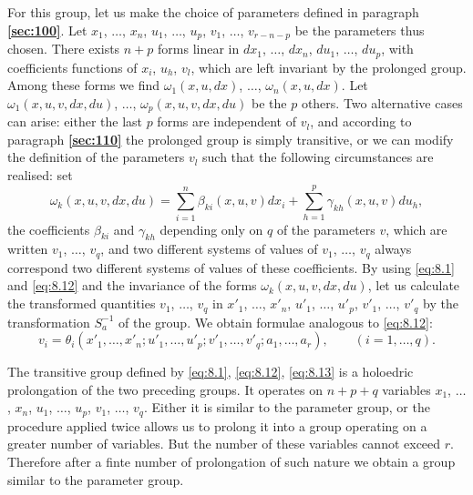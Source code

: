 \documentclass[leqno,11pt]{book}
\numberwithin{equation}{chapter}
\theoremstyle{shape1}
\theoremstyle{shapesmall}
\newcommand{\fsref}[1]{{\rm\textsection\textbf{\ref{sec:#1}}}}
\newcommand{\somespace}{\vspace{9pt}}
\begin{document}
For this group, let us make the choice of parameters defined in paragraph \fsref{100}. Let $x_{1}$, $\dots$, $x_{n}$, $u_{1}$, $\dots$, $u_{p}$, $v_{1}$, $\dots$, $v_{r-n-p}$ be the parameters thus chosen. There exists $n+p$ forms linear in $dx_{1}$, $\dots$, $dx_{n}$, $du_{1}$, $\dots$, $du_{p}$, with coefficients functions of $x_{i}$, $u_{h}$, $v_{l}$, which are left invariant by the prolonged group. Among these forms we find $\omega_{1}(x,u,dx)$, $\dots$, $\omega_{n}(x,u,dx)$. Let $\omega_{1}(x,u,v,dx,du)$, $\dots$, $\omega_{p}(x,u,v,dx,du)$ be the $p$ others. Two alternative cases can arise: either the last $p$ forms are independent of $v_{l}$, and according to paragraph \fsref{110} the prolonged group is simply transitive, or we can modify the definition of the parameters $v_{l}$ such that the following circumstances are realised: set
\[
\omega_{k}(x,u,v,dx,du)=\sum_{i=1}^{n}\beta_{ki}(x,u,v)dx_{i}+\sum_{h=1}^{p}\gamma_{kh}(x,u,v)du_{h},
\]
the coefficients $\beta_{ki}$ and $\gamma_{kh}$ depending only on $q$ of the parameters $v$, which are written $v_{1}$, $\dots$, $v_{q}$, and two different systems of values of $v_{1}$, $\dots$, $v_{q}$ always correspond two different systems of values of these coefficients. By using \eqref{eq:8.1} and \eqref{eq:8.12} and the invariance of the forms $\omega_{k}(x,u,v,dx,du)$, let us calculate the transformed quantities $v_{1}$, $\dots$, $v_{q}$ in $x'_{1}$, $\dots$, $x'_{n}$, $u'_{1}$, $\dots$, $u'_{p}$, $v'_{1}$, $\dots$, $v'_{q}$ by the transformation $S^{-1}_{a}$ of the group. We obtain formulae analogous to \eqref{eq:8.12}:
\begin{equation}
  \label{eq:8.13}
  v_{i}=\theta_{i}(x'_{1}, \dots, x'_{n};u'_{1}, \dots, u'_{p};v'_{1}, \dots, v'_{q};a_{1},\dots,a_{r}),\qquad (i=1,\dots,q).
\end{equation}

The transitive group defined by \eqref{eq:8.1}, \eqref{eq:8.12}, \eqref{eq:8.13} is a holoedric prolongation of the two preceding groups. It operates on $n+p+q$ variables $x_{1}$, $\dots$, $x_{n}$, $u_{1}$, $\dots$, $u_{p}$, $v_{1}$, $\dots$, $v_{q}$. Either it is similar to the parameter group, or the procedure applied twice allows us to prolong it into a group operating on a greater number of variables. But the number of these variables cannot exceed $r$. Therefore after a finte number of prolongation of such nature we obtain a group similar to the parameter group.

\somespace
\end{document}
